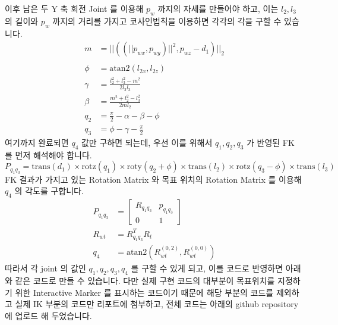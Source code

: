 \documentclass{article}
\begin{document}
이후 남은 두 Y 축 회전 Joint 를 이용해 $p_{w}$ 까지의 자세를 만들어야 하고, 이는 $l_{2}, l_{3}$ 의 길이와 $p_{w}$ 까지의 거리를 가지고 코사인법칙을 이용하면 각각의 각을 구할 수 있습니다.
\begin{align*}
m &= ||((||p_{wx}, p_{wy})||^{2}, p_{wz} - d_{1})||_{2} \\ \\
\phi &= \text{atan2}(l_{2x}, l_{2z})\\
\gamma &= \frac{l_{2}^2 + l_{3}^2 - m^2}{2l_{2}l_{3}} \\
\beta &= \frac{m^2 + l_{2}^2 - l_{3}^2}{2ml_{2}} \\
q_{2} &= \frac{\pi}{2} - \alpha - \beta - \phi \\
q_{3} &= \phi - \gamma - \frac{\pi}{2}
\end{align*}
여기까지 완료되면 $q_{4}$ 값만 구하면 되는데, 우선 이를 위해서 $q_{1}, q_{2}, q_{3}$ 가 반영된 FK 를 먼저 해석해야 합니다. $$P_{q_{1}q_{3}} = \text{trans}(d_{1})\times\text{rotz}(q_{1})\times\text{roty}(q_{2}+\phi)\times\text{trans}(l_{2})\times\text{rotz}(q_{3}-\phi) \times\text{trans}(l_{3})$$
FK 결과가 가지고 있는 Rotation Matrix 와 목표 위치의 Rotation Matrix 를 이용해 $q_{4}$ 의 각도를 구합니다. 
\begin{align*}
P_{q_{1}q_{3}}&=\begin{bmatrix}
R_{q_{1}q_{3}} & p_{q_{1}q_{3}} \\
0 & 1
\end{bmatrix} \\
R_{wt} &= R_{q_{1}q_{3}}^T R_{t} \\
q_{4} &= \text{atan2}(R_{wt}^{(0, 2)}, R_{wt}^{(0, 0)})
\end{align*}
따라서 각 joint 의 값인 $q_{1}, q_{2}, q_{3}, q_{4}$ 를 구할 수 있게 되고, 이를 코드로 반영하면 아래와 같은 코드로 만들 수 있습니다. 다만 실제 구현 코드의 대부분이 목표위치를 지정하기 위한 Interactive Marker 를 표시하는 코드이기 때문에 해당 부분의 코드를 제외하고 실제 IK 부분의 코드만 리포트에 첨부하고, 전체 코드는 아래의 github repository 에 업로드 해 두었습니다.
\end{document}
